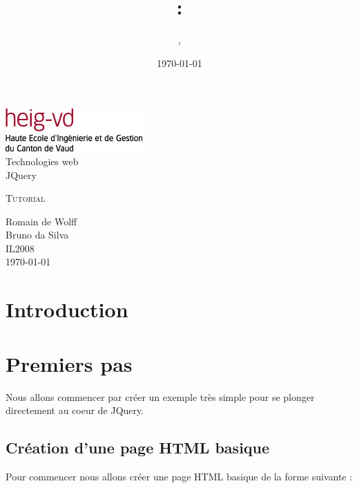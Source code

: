 \documentclass[10pt,a4paper,titlepage]{article}
\author{\auteurOne, \auteurTwo}
\title{\branchetag : \laboname}
\date{\today}
\newcommand{\branche}{Technologies web}
\newcommand{\laboname}{JQuery}
\newcommand{\auteurOne}{Romain de Wolff}
\newcommand{\auteurTwo}{Bruno da Silva}
\newcommand{\promo}{IL2008}
\begin{document}
\pagestyle{headings}
\begin{titlepage}
	\begin{center}
	\includegraphics{img/logo-HEIG-VD.jpg}\\
		\vspace{3cm}
		\LARGE \branche %
		\vspace{3cm}\\
		\Huge \laboname \\
		\vspace{3cm}

		\Large \textsc{Tutorial} \\
		\vspace{3cm}

		\large \auteurOne \\
		\auteurTwo \\	
		\vspace{10pt}
		\normalsize \textsc{\promo} \\

		\vspace{2cm}
		\today
	\end{center}
\end{titlepage}

\tableofcontents
\newpage
\pagestyle{fancy}
\section{Introduction}


\newpage
\section{Premiers pas}

Nous allons commencer par créer un exemple très simple pour se plonger directement  au coeur de JQuery.

\subsection{Création d'une page HTML basique}

Pour commencer nous allons créer une page HTML basique de la forme suivante :
\end{document}
